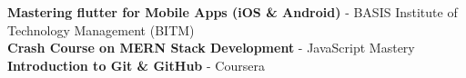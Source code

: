 
\vspace{2mm}

 \textbf{Mastering flutter for Mobile Apps (iOS \& Android)} - BASIS Institute of Technology Management (BITM) \\
 \vspace{1mm}
 \textbf{Crash Course on MERN Stack Development} - JavaScript Mastery \\
 \vspace{1mm}
 \textbf{Introduction to Git \& GitHub } - Coursera \\
\vspace{5mm}